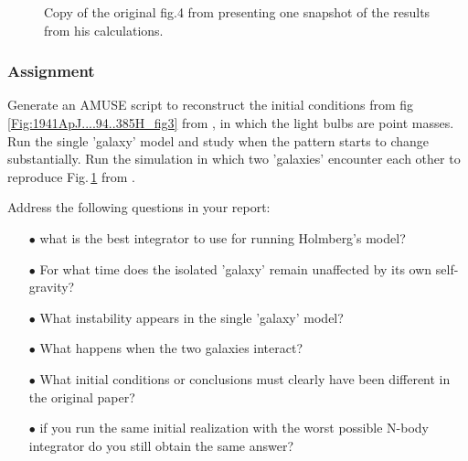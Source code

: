 \begin{figure}[htbp] 
  \begin{center}
      \caption{{\small Copy of the original fig.4 from
          \cite{1941ApJ....94..385H} presenting one snapshot of the
          results from his calculations. }
      \label{Fig:1941ApJ....94..385H_fig4}
      }
  \end{center}
\end{figure}

\subsubsection{Assignment}
Generate an AMUSE script to reconstruct the initial conditions from
fig\,\ref{Fig:1941ApJ....94..385H_fig3} from
\cite{1941ApJ....94..385H}, in which the light bulbs are point masses.
Run the single 'galaxy' model and study when the pattern starts to
change substantially. Run the simulation in which two 'galaxies'
encounter each other to reproduce
Fig.\,\ref{Fig:1941ApJ....94..385H_fig4} from
\cite{1941ApJ....94..385H}.

Address the following questions in your report:
\begin{itemize}
\item[$\bullet$] what is the best integrator to use for running Holmberg's model?
\item[$\bullet$] For what time does the isolated 'galaxy' remain unaffected by its own self-gravity?
\item[$\bullet$] What instability appears in the single 'galaxy' model?
\item[$\bullet$] What happens when the two galaxies interact?
\item[$\bullet$] What initial conditions or conclusions must clearly have been
  different in the original paper?
\item[$\bullet$] if you run the same initial realization with the worst
  possible N-body integrator do you still obtain the same answer?
\end{itemize}


%


